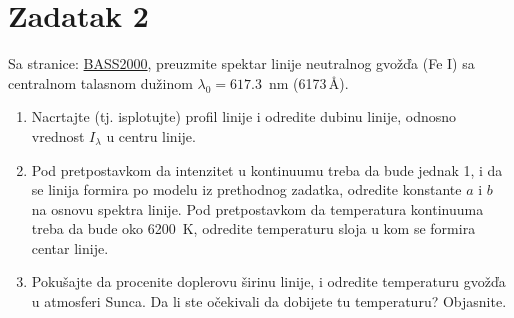 \documentclass[12pt]{article}
\begin{document}
\section*{Zadatak 2}

Sa stranice: \href{https://bass2000.obspm.fr/solar_spect.php}{BASS2000}, preuzmite spektar linije neutralnog gvo\v{z}\v{d}a (Fe I) sa centralnom talasnom du\v{z}inom $\lambda_0=617.3$~nm (6173\,\AA). 

\begin{enumerate}
    
    \item Nacrtajte (tj. isplotujte) profil linije i odredite dubinu linije, odnosno vrednost $I_\lambda$ u centru linije. 

    \item Pod pretpostavkom da intenzitet u kontinuumu treba da bude jednak 1, i da se linija formira po modelu iz prethodnog zadatka, odredite konstante $a$ i $b$ na osnovu spektra linije. Pod pretpostavkom da temperatura kontinuuma treba da bude oko 6200~K, odredite temperaturu sloja u kom se formira centar linije. 
    
    \item Poku\v{s}ajte da procenite doplerovu \v{s}irinu linije, i odredite temperaturu gvo\v{z}\v{d}a u atmosferi Sunca. Da li ste o\v{c}ekivali da dobijete tu temperaturu? Objasnite.

\end{enumerate}
\end{document}

